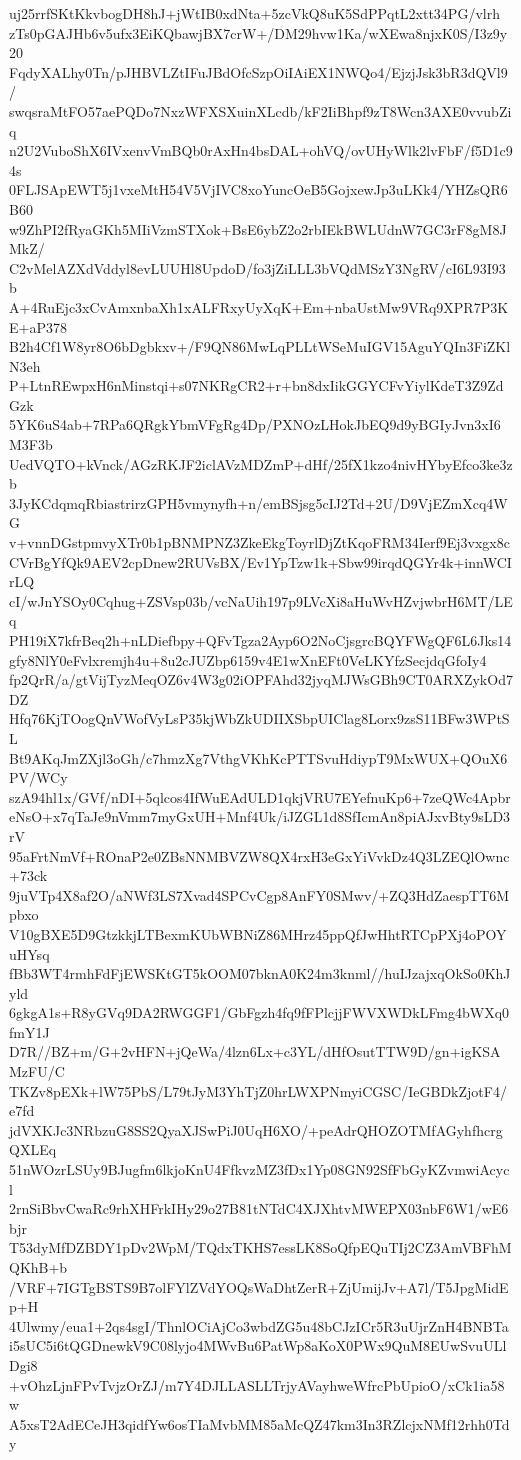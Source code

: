 uj25rrfSKtKkvbogDH8hJ+jWtIB0xdNta+5zcVkQ8uK5SdPPqtL2xtt34PG/vlrh
zTs0pGAJHb6v5ufx3EiKQbawjBX7crW+/DM29hvw1Ka/wXEwa8njxK0S/I3z9y20
FqdyXALhy0Tn/pJHBVLZtIFuJBdOfcSzpOiIAiEX1NWQo4/EjzjJsk3bR3dQVl9/
swqsraMtFO57aePQDo7NxzWFXSXuinXLcdb/kF2IiBhpf9zT8Wcn3AXE0vvubZiq
n2U2VuboShX6IVxenvVmBQb0rAxHn4bsDAL+ohVQ/ovUHyWlk2lvFbF/f5D1c94s
0FLJSApEWT5j1vxeMtH54V5VjIVC8xoYuncOeB5GojxewJp3uLKk4/YHZsQR6B60
w9ZhPI2fRyaGKh5MIiVzmSTXok+BsE6ybZ2o2rbIEkBWLUdnW7GC3rF8gM8JMkZ/
C2vMelAZXdVddyl8evLUUHl8UpdoD/fo3jZiLLL3bVQdMSzY3NgRV/cI6L93I93b
A+4RuEjc3xCvAmxnbaXh1xALFRxyUyXqK+Em+nbaUstMw9VRq9XPR7P3KE+aP378
B2h4Cf1W8yr8O6bDgbkxv+/F9QN86MwLqPLLtWSeMuIGV15AguYQIn3FiZKlN3eh
P+LtnREwpxH6nMinstqi+s07NKRgCR2+r+bn8dxIikGGYCFvYiylKdeT3Z9ZdGzk
5YK6uS4ab+7RPa6QRgkYbmVFgRg4Dp/PXNOzLHokJbEQ9d9yBGIyJvn3xI6M3F3b
UedVQTO+kVnck/AGzRKJF2iclAVzMDZmP+dHf/25fX1kzo4nivHYbyEfco3ke3zb
3JyKCdqmqRbiastrirzGPH5vmynyfh+n/emBSjsg5cIJ2Td+2U/D9VjEZmXcq4WG
v+vnnDGstpmvyXTr0b1pBNMPNZ3ZkeEkgToyrlDjZtKqoFRM34Ierf9Ej3vxgx8c
CVrBgYfQk9AEV2cpDnew2RUVsBX/Ev1YpTzw1k+Sbw99irqdQGYr4k+innWCIrLQ
cI/wJnYSOy0Cqhug+ZSVsp03b/vcNaUih197p9LVcXi8aHuWvHZvjwbrH6MT/LEq
PH19iX7kfrBeq2h+nLDiefbpy+QFvTgza2Ayp6O2NoCjsgrcBQYFWgQF6L6Jks14
gfy8NlY0eFvlxremjh4u+8u2cJUZbp6159v4E1wXnEFt0VeLKYfzSecjdqGfoIy4
fp2QrR/a/gtVijTyzMeqOZ6v4W3g02iOPFAhd32jyqMJWsGBh9CT0ARXZykOd7DZ
Hfq76KjTOogQnVWofVyLsP35kjWbZkUDIIXSbpUIClag8Lorx9zsS11BFw3WPtSL
Bt9AKqJmZXjl3oGh/c7hmzXg7VthgVKhKcPTTSvuHdiypT9MxWUX+QOuX6PV/WCy
szA94hl1x/GVf/nDI+5qlcos4IfWuEAdULD1qkjVRU7EYefnuKp6+7zeQWc4Apbr
eNsO+x7qTaJe9nVmm7myGxUH+Mnf4Uk/iJZGL1d8SfIcmAn8piAJxvBty9sLD3rV
95aFrtNmVf+ROnaP2e0ZBsNNMBVZW8QX4rxH3eGxYiVvkDz4Q3LZEQlOwnc+73ck
9juVTp4X8af2O/aNWf3LS7Xvad4SPCvCgp8AnFY0SMwv/+ZQ3HdZaespTT6Mpbxo
V10gBXE5D9GtzkkjLTBexmKUbWBNiZ86MHrz45ppQfJwHhtRTCpPXj4oPOYuHYsq
fBb3WT4rmhFdFjEWSKtGT5kOOM07bknA0K24m3knml//huIJzajxqOkSo0KhJyld
6gkgA1s+R8yGVq9DA2RWGGF1/GbFgzh4fq9fFPlcjjFWVXWDkLFmg4bWXq0fmY1J
D7R//BZ+m/G+2vHFN+jQeWa/4lzn6Lx+c3YL/dHfOsutTTW9D/gn+igKSAMzFU/C
TKZv8pEXk+lW75PbS/L79tJyM3YhTjZ0hrLWXPNmyiCGSC/IeGBDkZjotF4/e7fd
jdVXKJc3NRbzuG8SS2QyaXJSwPiJ0UqH6XO/+peAdrQHOZOTMfAGyhfhcrgQXLEq
51nWOzrLSUy9BJugfm6lkjoKnU4FfkvzMZ3fDx1Yp08GN92SfFbGyKZvmwiAcycl
2rnSiBbvCwaRc9rhXHFrkIHy29o27B81tNTdC4XJXhtvMWEPX03nbF6W1/wE6bjr
T53dyMfDZBDY1pDv2WpM/TQdxTKHS7essLK8SoQfpEQuTIj2CZ3AmVBFhMQKhB+b
/VRF+7IGTgBSTS9B7olFYlZVdYOQsWaDhtZerR+ZjUmijJv+A7l/T5JpgMidEp+H
4Ulwmy/eua1+2qs4sgI/ThnlOCiAjCo3wbdZG5u48bCJzICr5R3uUjrZnH4BNBTa
i5sUC5i6tQGDnewkV9C08lyjo4MWvBu6PatWp8aKoX0PWx9QuM8EUwSvuULlDgi8
+vOhzLjnFPvTvjzOrZJ/m7Y4DJLLASLLTrjyAVayhweWfrcPbUpioO/xCk1ia58w
A5xsT2AdECeJH3qidfYw6osTIaMvbMM85aMcQZ47km3In3RZlcjxNMf12rhh0Tdy
